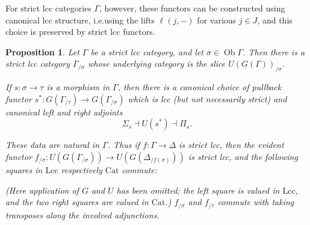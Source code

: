 \documentclass[a4paper]{article}
\newtheorem{proposition}[theorem]{Proposition}
\theoremstyle{remark}
\theoremstyle{definition}
\begin{document}
For strict lcc categories $\Gamma$, however, these functors can be constructed using canonical lcc structure, i.e.\@ using the lifts $\ell(j, -)$ for various $j \in J$, and this choice is preserved by strict lcc functors.
\begin{proposition}
  \label{prop:strict-slicing}
  Let $\Gamma$ be a strict lcc category, and let $\sigma \in \operatorname{Ob} \Gamma$.
  Then there is a strict lcc category $\Gamma_{/ \sigma}$ whose underlying category is the slice $U(G(\Gamma))_{/ \sigma}$.

  If $s : \sigma \rightarrow \tau$ is a morphism in $\Gamma$, then there is a canonical choice of pullback functor $s^* : G(\Gamma_{/ \tau}) \rightarrow G(\Gamma_{/ \sigma})$ which is lcc (but not necessarily strict) and canonical left and right adjoints
  \begin{equation}
    \Sigma_s \dashv U(s^*) \dashv \Pi_s.
  \end{equation}

  These data are natural in $\Gamma$.
  Thus if $f : \Gamma \rightarrow \Delta$ is strict lcc, then the evident functor $f_{/ \sigma} : U(G(\Gamma_{/ \sigma})) \rightarrow U(G(\Delta_{ / f(\sigma)}))$ is strict lcc, and the following squares in $\mathrm{Lcc}$ respectively $\mathrm{Cat}$ commute:
  (Here application of $G$ and $U$ has been omitted; the left square is valued in $\mathrm{Lcc}$, and the two right squares are valued in $\mathrm{Cat}$.)
  $f_{/ \sigma}$ and $f_{/ \tau}$ commute with taking transposes along the involved adjunctions.
\end{proposition}
\end{document}
